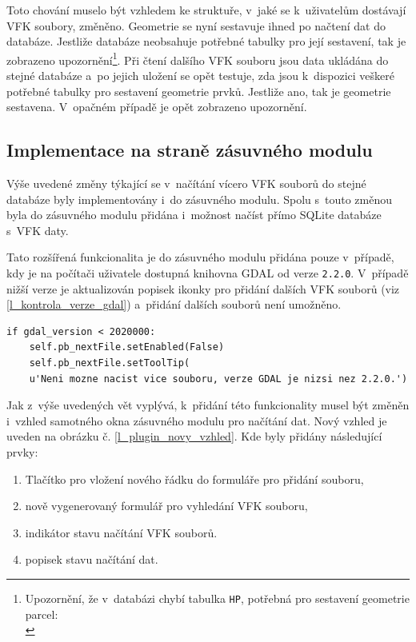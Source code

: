 \documentclass[a4paper,12pt,oneside]{book}
\begin{document}
Toto chování muselo být vzhledem ke struktuře, v~jaké se k~uživatelům dostávají VFK soubory, změněno. Geometrie se nyní sestavuje ihned po načtení dat do databáze. Jestliže databáze neobsahuje potřebné tabulky pro její sestavení, tak je zobrazeno upozornění\footnote{Upozornění, že v~databázi chybí tabulka \texttt{HP}, potřebná pro sestavení geometrie parcel:\\}. Při čtení dalšího VFK souboru jsou data ukládána do stejné databáze a~po jejich uložení se opět testuje, zda jsou k~dispozici veškeré potřebné tabulky pro sestavení geometrie prvků. Jestliže ano, tak je geometrie sestavena. V~opačném případě je opět zobrazeno upozornění. 

\subsection{Implementace na straně zásuvného modulu}
Výše uvedené změny týkající se v~načítání vícero VFK souborů do stejné databáze byly implementovány i~do zásuvného modulu. Spolu s~touto změnou byla do zásuvného modulu přidána i~možnost načíst přímo SQLite databáze s~VFK daty.

Tato rozšířená funkcionalita je do zásuvného modulu přidána pouze v~případě, kdy je na počítači uživatele dostupná knihovna GDAL od verze \texttt{2.2.0}. V~případě nižší verze je aktualizován popisek ikonky pro přidání dalších VFK souborů (viz \ref{l_kontrola_verze_gdal}) a~přidání dalších souborů není umožněno.

\begin{lstlisting}[style=python, 
		    caption={Kontrola verze GDAL na straně VFK pluginu}, 
		    label=l_kontrola_verze_gdal]
if gdal_version < 2020000:
    self.pb_nextFile.setEnabled(False)
    self.pb_nextFile.setToolTip(
	u'Neni mozne nacist vice souboru, verze GDAL je nizsi nez 2.2.0.')
\end{lstlisting}

Jak z~výše uvedených vět vyplývá, k~přidání této funkcionality musel být změněn i~vzhled samotného okna zásuvného modulu pro načítání dat. Nový vzhled je uveden na obrázku č. \ref{l_plugin_novy_vzhled}. Kde byly přidány následující prvky:

\begin{enumerate}
 \item Tlačítko pro vložení nového řádku do formuláře pro přidání souboru,
 \item nově vygenerovaný formulář pro vyhledání VFK souboru,
 \item indikátor stavu načítání VFK souborů.
 \item popisek stavu načítání dat.
\end{enumerate}
\end{document}
